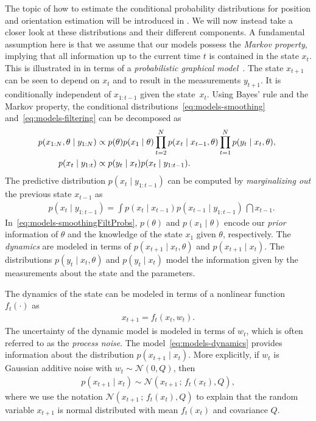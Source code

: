 The topic of how to estimate the conditional probability distributions for position and orientation estimation will be introduced in . We will now instead take a closer look at these distributions and their different components. A fundamental assumption here is that we assume that our models possess the \emph{Markov property}, implying that all information up to the current time $t$ is contained in the state $x_t$. This is illustrated in  in terms of a \emph{probabilistic graphical model}~\citep{bishop:2006}. The state $x_{t+1}$ can be seen to depend on $x_t$ and to result in the measurements $y_{t+1}$. It is conditionally independent of $x_{1:t-1}$ given the state~$x_t$. Using Bayes' rule and the Markov property, the conditional distributions~\eqref{eq:models-smoothing} and~\eqref{eq:models-filtering} can be decomposed as
\begin{subequations}
\label{eq:models-smoothingFiltProbs}
\begin{align}
\hspace{-2mm} p(x_{1:N}, \theta \mid y_{1:N} ) &\propto p(\theta) p(x_1 \mid \theta) \prod_{t=2}^N p(x_t \mid x_{t-1}, \theta) \prod_{t=1}^N p(y_t \mid x_t, \theta) \label{eq:models-smoothingProbs}, \hspace{-1mm} \\
p(x_t \mid y_{1:t} ) &\propto p(y_t \mid x_t) p(x_t \mid y_{1:t-1}) \label{eq:models-filteringProbs}.
\end{align}
\end{subequations}
The predictive distribution $p(x_t \mid y_{1:t-1})$ can be computed by \emph{marginalizing out} the previous state $x_{t-1}$ as
\begin{align}
&p(x_t \mid y_{1:t-1}) = \int p(x_t \mid x_{t-1}) p(x_{t-1} \mid y_{1:t-1}) \, \dint x_{t-1}.
\end{align}
In~\eqref{eq:models-smoothingFiltProbs}, $p(\theta)$ and $p(x_1 \mid \theta)$ encode our \emph{prior} information of $\theta$ and the knowledge of the state $x_1$ given $\theta$, respectively. The \emph{dynamics} are modeled in terms of $p(x_{t+1} \mid x_{t} , \theta)$ and $p(x_{t+1} \mid x_{t})$. The distributions $p(y_t \mid x_{t} , \theta)$ and $p(y_t \mid x_{t})$ model the information given by the measurements about the state and the parameters.

The dynamics of the state can be modeled in terms of a nonlinear function $f_t(\cdot)$ as
\begin{align}
\label{eq:models-dynamics}
x_{t+1} = f_t (x_t, w_t).
\end{align}
The uncertainty of the dynamic model is modeled in terms of $w_t$, which is often referred to as the \emph{process noise}. The model~\eqref{eq:models-dynamics} provides information about the distribution $p(x_{t+1} \mid x_t)$. More explicitly, if $w_t$ is Gaussian additive noise with $w_t \sim \mathcal{N}(0,Q)$, then
\begin{align}
p(x_{t+1} \mid x_t) \sim \mathcal{N}(x_{t+1} \, ; \, f_t(x_t), Q),
\end{align}
where we use the notation $\mathcal{N}(x_{t+1} \, ; \, f_t(x_t), Q)$ to explain that the random variable $x_{t+1}$ is normal distributed with mean $f_t(x_t)$ and covariance $Q$. 


